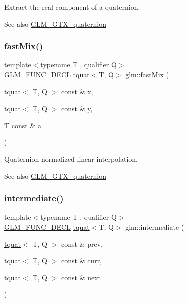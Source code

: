 Extract the real component of a quaternion.

\begin{DoxySeeAlso}{See also}
\hyperlink{group__gtx__quaternion}{G\+L\+M\+\_\+\+G\+T\+X\+\_\+quaternion} 
\end{DoxySeeAlso}
\mbox{\label{group__gtx__quaternion_gac5c77bc74dfc750aaf271d68f271bf2b}} 
\subsubsection{\texorpdfstring{fast\+Mix()}{fastMix()}}
{\footnotesize\ttfamily template$<$typename T , qualifier Q$>$ \\
\hyperlink{setup_8hpp_ab2d052de21a70539923e9bcbf6e83a51}{G\+L\+M\+\_\+\+F\+U\+N\+C\+\_\+\+D\+E\+CL} \hyperlink{structglm_1_1tquat}{tquat}$<$T, Q$>$ glm\+::fast\+Mix (\begin{DoxyParamCaption}\item[{\hyperlink{structglm_1_1tquat}{tquat}$<$ T, Q $>$ const \&}]{x,  }\item[{\hyperlink{structglm_1_1tquat}{tquat}$<$ T, Q $>$ const \&}]{y,  }\item[{T const \&}]{a }\end{DoxyParamCaption})}

Quaternion normalized linear interpolation.

\begin{DoxySeeAlso}{See also}
\hyperlink{group__gtx__quaternion}{G\+L\+M\+\_\+\+G\+T\+X\+\_\+quaternion} 
\end{DoxySeeAlso}
\mbox{\label{group__gtx__quaternion_gac9be2084562a52ae8923813233563a28}} 
\subsubsection{\texorpdfstring{intermediate()}{intermediate()}}
{\footnotesize\ttfamily template$<$typename T , qualifier Q$>$ \\
\hyperlink{setup_8hpp_ab2d052de21a70539923e9bcbf6e83a51}{G\+L\+M\+\_\+\+F\+U\+N\+C\+\_\+\+D\+E\+CL} \hyperlink{structglm_1_1tquat}{tquat}$<$T, Q$>$ glm\+::intermediate (\begin{DoxyParamCaption}\item[{\hyperlink{structglm_1_1tquat}{tquat}$<$ T, Q $>$ const \&}]{prev,  }\item[{\hyperlink{structglm_1_1tquat}{tquat}$<$ T, Q $>$ const \&}]{curr,  }\item[{\hyperlink{structglm_1_1tquat}{tquat}$<$ T, Q $>$ const \&}]{next }\end{DoxyParamCaption})}

